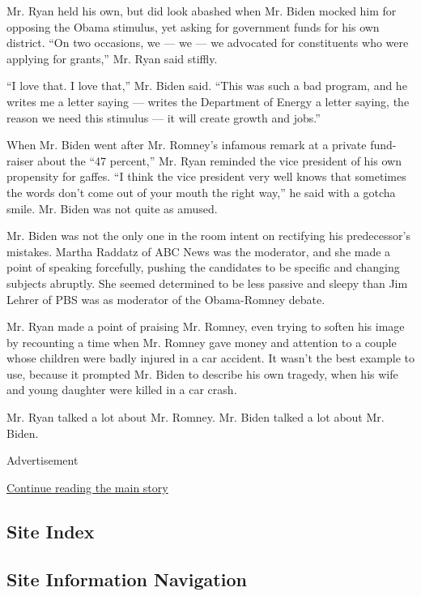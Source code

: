 Mr. Ryan held his own, but did look abashed when Mr. Biden mocked him
for opposing the Obama stimulus, yet asking for government funds for his
own district. ``On two occasions, we --- we --- we advocated for
constituents who were applying for grants,'' Mr. Ryan said stiffly.

``I love that. I love that,'' Mr. Biden said. ``This was such a bad
program, and he writes me a letter saying --- writes the Department of
Energy a letter saying, the reason we need this stimulus --- it will
create growth and jobs.''

When Mr. Biden went after Mr. Romney's infamous remark at a private
fund-raiser about the ``47 percent,'' Mr. Ryan reminded the vice
president of his own propensity for gaffes. ``I think the vice president
very well knows that sometimes the words don't come out of your mouth
the right way,'' he said with a gotcha smile. Mr. Biden was not quite as
amused.

Mr. Biden was not the only one in the room intent on rectifying his
predecessor's mistakes. Martha Raddatz of ABC News was the moderator,
and she made a point of speaking forcefully, pushing the candidates to
be specific and changing subjects abruptly. She seemed determined to be
less passive and sleepy than Jim Lehrer of PBS was as moderator of the
Obama-Romney debate.

Mr. Ryan made a point of praising Mr. Romney, even trying to soften his
image by recounting a time when Mr. Romney gave money and attention to a
couple whose children were badly injured in a car accident. It wasn't
the best example to use, because it prompted Mr. Biden to describe his
own tragedy, when his wife and young daughter were killed in a car
crash.

Mr. Ryan talked a lot about Mr. Romney. Mr. Biden talked a lot about Mr.
Biden.

Advertisement

\protect\hyperlink{after-bottom}{Continue reading the main story}

\hypertarget{site-index}{%
\subsection{Site Index}\label{site-index}}

\hypertarget{site-information-navigation}{%
\subsection{Site Information
Navigation}\label{site-information-navigation}}


